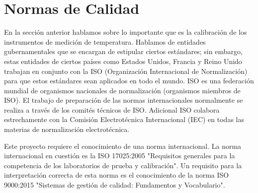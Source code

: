 \section{Normas de Calidad}

\par 
En la sección anterior hablamos sobre lo importante que es la calibración de los instrumentos de medición de temperatura. Hablamos de entidades gubernamentales que se encargan de estipular ciertos estándares; sin embargo, estas entidades de ciertos países como Estados Unidos, Francia y Reino Unido trabajan en conjunto con la ISO (Organización Internacional de Normalización) para que estos estándares sean aplicados en todo el mundo. ISO es una federación mundial de organismos nacionales de normalización (organismos miembros de ISO). El trabajo de preparación de las normas internacionales normalmente se realiza a través de los comités técnicos de ISO. Adicional ISO colabora estrechamente con la Comisión Electrotécnica Internacional (IEC) en todas las materias de normalización electrotécnica.

\par \noindent
Este proyecto requiere el conocimiento de una norma internacional. La norma internacional en cuestión es la ISO 17025:2005 "Requisitos generales para la competencia de los laboratorios de prueba y calibración". Un requisito para la interpretación correcta de esta norma es el conocimiento de la norma ISO 9000:2015 "Sistemas de gestión de calidad: Fundamentos y Vocabulario". 






